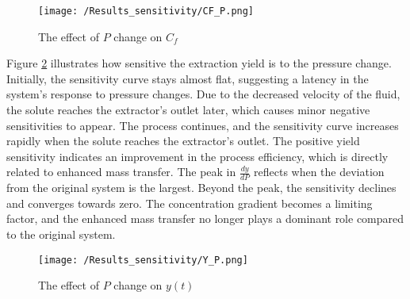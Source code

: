 \documentclass[../Article_Sensitivity_Analsysis.tex]{subfiles}
\begin{document}
	\begin{figure}[h!]
		\centering
		\texttt{[image: /Results\_sensitivity/CF\_P.png]}
		\caption{The effect of $P$ change on $C_f$}
		\label{fig:Sensitivty_P_CF}
	\end{figure}
	
	Figure \ref{fig:Sensitivty_P_y} illustrates how sensitive the extraction yield is to the pressure change. Initially, the sensitivity curve stays almost flat, suggesting a latency in the system's response to pressure changes. Due to the decreased velocity of the fluid, the solute reaches the extractor's outlet later, which causes minor negative sensitivities to appear. The process continues, and the sensitivity curve increases rapidly when the solute reaches the extractor's outlet. The positive yield sensitivity indicates an improvement in the process efficiency, which is directly related to enhanced mass transfer. The peak in $\frac{dy}{dP}$ reflects when the deviation from the original system is the largest. Beyond the peak, the sensitivity declines and converges towards zero. The concentration gradient becomes a limiting factor, and the enhanced mass transfer no longer plays a dominant role compared to the original system.
	
	\begin{figure}[h!]
		\centering
		\texttt{[image: /Results\_sensitivity/Y\_P.png]}
		\caption{The effect of $P$ change on $y(t)$}
		\label{fig:Sensitivty_P_y}
	\end{figure}
		
\end{document}
